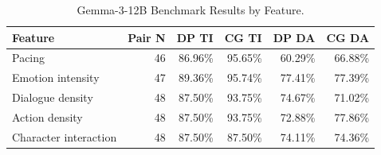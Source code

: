 \begin{table}[htbp]
\centering
\caption{Gemma-3-12B Benchmark Results by Feature.}
\label{tab:table8_primary_by_feature}
\begin{tabular}{lrrrrr}
\toprule
Feature & Pair N & DP TI & CG TI & DP DA & CG DA \\
\midrule
Pacing & 46 & 86.96\% & 95.65\% & 60.29\% & 66.88\% \\
Emotion intensity & 47 & 89.36\% & 95.74\% & 77.41\% & 77.39\% \\
Dialogue density & 48 & 87.50\% & 93.75\% & 74.67\% & 71.02\% \\
Action density & 48 & 87.50\% & 93.75\% & 72.88\% & 77.86\% \\
Character interaction & 48 & 87.50\% & 87.50\% & 74.11\% & 74.36\% \\
\bottomrule
\end{tabular}
\end{table}
